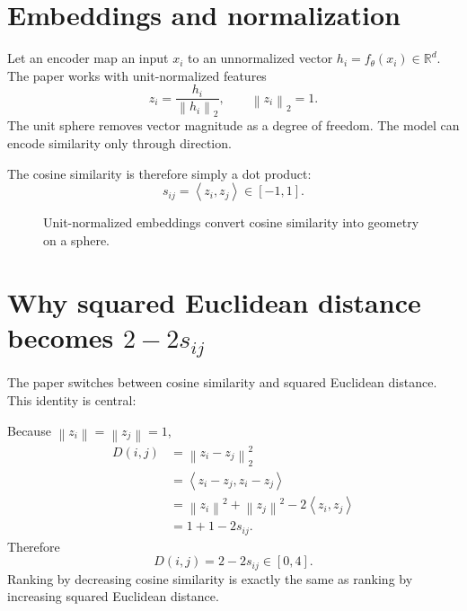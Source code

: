 \documentclass[11pt,oneside,openany]{book}
\theoremstyle{myplain}
\theoremstyle{definition}
\newcommand{\R}{\mathbb{R}}
\newcommand{\norm}[1]{\left\lVert #1\right\rVert}
\newcommand{\inner}[2]{\left\langle #1,#2\right\rangle}
\begin{document}
\section{Embeddings and normalization}

Let an encoder map an input $x_i$ to an unnormalized vector $h_i=f_\theta(x_i)\in\R^d$. The paper works with unit-normalized features
\begin{equation}
  z_i=\frac{h_i}{\norm{h_i}_2},\qquad \norm{z_i}_2=1.
  \label{eq:normalize}
\end{equation}
The unit sphere removes vector magnitude as a degree of freedom. The model can encode similarity only through direction.

The cosine similarity is therefore simply a dot product:
\begin{equation}
  s_{ij}=\inner{z_i}{z_j}\in[-1,1].
  \label{eq:cosine}
\end{equation}

\begin{figure}[H]
\centering
{}
\caption{Unit-normalized embeddings convert cosine similarity into geometry on a sphere.}
\label{fig:unit-sphere}
\end{figure}

\section{Why squared Euclidean distance becomes $2-2s_{ij}$}

The paper switches between cosine similarity and squared Euclidean distance. This identity is central:
\begin{derivationbox}[title=Cosine--distance equivalence]
Because $\norm{z_i}=\norm{z_j}=1$,
\begin{align}
D(i,j)
  &=\norm{z_i-z_j}_2^2\\
  &=\inner{z_i-z_j}{z_i-z_j}\\
  &=\norm{z_i}^2+\norm{z_j}^2-2\inner{z_i}{z_j}\\
  &=1+1-2s_{ij}.
\end{align}
Therefore
\begin{equation}
  \boxed{D(i,j)=2-2s_{ij}\in[0,4].}
  \label{eq:cosdist}
\end{equation}
Ranking by decreasing cosine similarity is exactly the same as ranking by increasing squared Euclidean distance.
\end{derivationbox}
\end{document}
